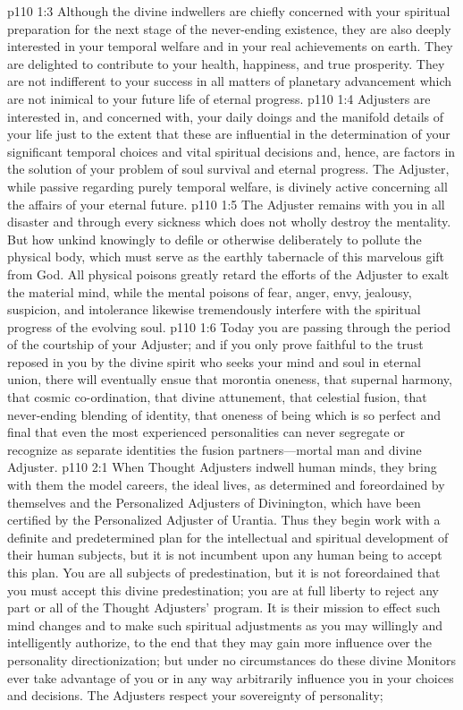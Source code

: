 \vs p110 1:3 Although the divine indwellers are chiefly concerned with your spiritual preparation for the next stage of the never\hyp{}ending existence, they are also deeply interested in your temporal welfare and in your real achievements on earth. They are delighted to contribute to your health, happiness, and true prosperity. They are not indifferent to your success in all matters of planetary advancement which are not inimical to your future life of eternal progress.\plusone
\pc \vs p110 1:4 Adjusters are interested in, and concerned with, your daily doings and the manifold details of your life just to the extent that these are influential in the determination of your significant temporal choices and vital spiritual decisions and, hence, are factors in the solution of your problem of soul survival and eternal progress. The Adjuster, while passive regarding purely temporal welfare, is divinely active concerning all the affairs of your eternal future.
\vs p110 1:5 The Adjuster remains with you in all disaster and through every sickness which does not wholly destroy the mentality. But how unkind knowingly to defile or otherwise deliberately to pollute the physical body, which must serve as the earthly tabernacle of this marvelous gift from God. All physical poisons greatly retard the efforts of the Adjuster to exalt the material mind, while the mental poisons of fear, anger, envy, jealousy, suspicion, and intolerance likewise tremendously interfere with the spiritual progress of the evolving soul.\plusone
\pc \vs p110 1:6 Today you are passing through the period of the courtship of your Adjuster; and if you only prove faithful to the trust reposed in you by the divine spirit who seeks your mind and soul in eternal union, there will eventually ensue that morontia oneness, that supernal harmony, that cosmic co\hyp{}ordination, that divine attunement, that celestial fusion, that never\hyp{}ending blending of identity, that oneness of being which is so perfect and final that even the most experienced personalities can never segregate or recognize as separate identities the fusion partners---mortal man and divine Adjuster.
\vs p110 2:1 When Thought Adjusters indwell human minds, they bring with them the model careers, the ideal lives, as determined and foreordained by themselves and the Personalized Adjusters of Divinington, which have been certified by the Personalized Adjuster of Urantia. Thus they begin work with a definite and predetermined plan for the intellectual and spiritual development of their human subjects, but it is not incumbent upon any human being to accept this plan. You are all subjects of predestination, but it is not foreordained that you must accept this divine predestination; you are at full liberty to reject any part or all of the Thought Adjusters’ program. It is their mission to effect such mind changes and to make such spiritual adjustments as you may willingly and intelligently authorize, to the end that they may gain more influence over the personality directionization; but under no circumstances do these divine Monitors ever take advantage of you or in any way arbitrarily influence you in your choices and decisions. The Adjusters respect your sovereignty of personality; 
